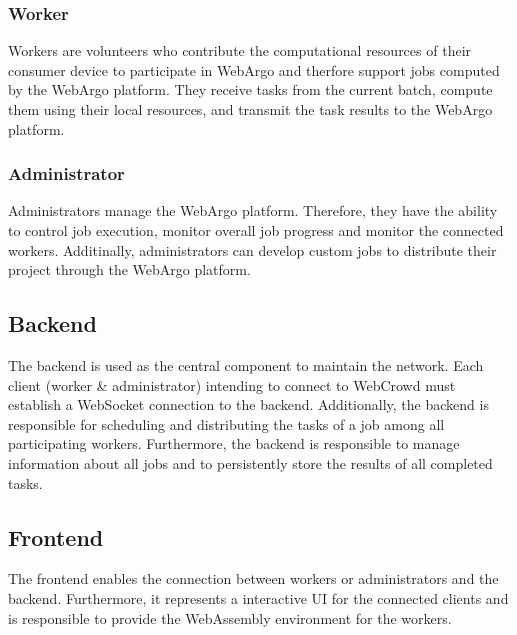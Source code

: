 \subsubsection{Worker}
\label{subsec:concept:worker}
Workers are volunteers who contribute the computational resources of their consumer device to participate in WebArgo and therfore support jobs computed by the WebArgo platform. They receive tasks from the current batch, compute them using their local resources, and transmit the task results to the WebArgo platform.

\subsubsection{Administrator}
\label{ssubsec:concept:admin}
Administrators manage the WebArgo platform. Therefore, they have the ability to control job execution, monitor overall job progress and monitor the connected workers. Additinally, administrators can develop custom jobs to distribute their project through the WebArgo platform.

\subsection{Backend}
\label{subsec:concept:backend}
The backend is used as the central component to maintain the network. Each client (worker \& administrator) intending to connect to WebCrowd must establish a WebSocket connection to the backend. Additionally, the backend is responsible for scheduling and distributing the tasks of a job among all participating workers. Furthermore, the backend is responsible to manage information about all jobs and to persistently store the results of all completed tasks.

\subsection{Frontend}
\label{subsec:concept:frontend}
The frontend enables the connection between workers or administrators and the backend. Furthermore, it represents a interactive \ac{UI} for the connected clients and is responsible to provide the WebAssembly environment for the workers.

